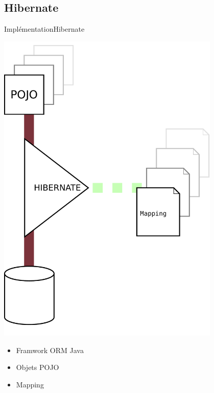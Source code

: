 \subsection{Hibernate}
\begin{frame}{Implémentation}{Hibernate}
	\begin{minipage}{0.4\textwidth}
		\includegraphics[width=0.8\textwidth]{files/hibernate}	
	\end{minipage}
	\begin{minipage}{0.55\textwidth}
		\begin{itemize}
		\item Framwork ORM Java
		\item Objets POJO
		\item Mapping
		\end{itemize}
	\end{minipage}
\end{frame}

